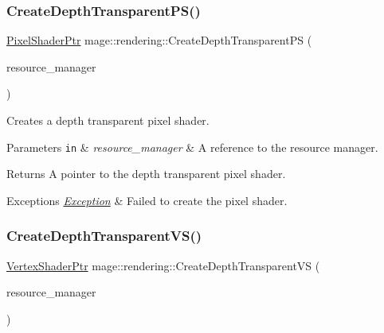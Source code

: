 \subsubsection{\texorpdfstring{Create\+Depth\+Transparent\+P\+S()}{CreateDepthTransparentPS()}}
{\footnotesize\ttfamily \mbox{\hyperlink{namespacemage_1_1rendering_af03d922b228ee9c8542baaa2ecc9f259}{Pixel\+Shader\+Ptr}} mage\+::rendering\+::\+Create\+Depth\+Transparent\+PS (\begin{DoxyParamCaption}\item[{\mbox{\hyperlink{classmage_1_1rendering_1_1_resource_manager}{Resource\+Manager}} \&}]{resource\+\_\+manager }\end{DoxyParamCaption})}

Creates a depth transparent pixel shader.


\begin{DoxyParams}[1]{Parameters}
\mbox{\tt in}  & {\em resource\+\_\+manager} & A reference to the resource manager. \\
\hline
\end{DoxyParams}
\begin{DoxyReturn}{Returns}
A pointer to the depth transparent pixel shader. 
\end{DoxyReturn}

\begin{DoxyExceptions}{Exceptions}
{\em \mbox{\hyperlink{classmage_1_1_exception}{Exception}}} & Failed to create the pixel shader. \\
\hline
\end{DoxyExceptions}
\mbox{\label{namespacemage_1_1rendering_afe609dd7d958d13de0d47f7619aeb74c}} 
\subsubsection{\texorpdfstring{Create\+Depth\+Transparent\+V\+S()}{CreateDepthTransparentVS()}}
{\footnotesize\ttfamily \mbox{\hyperlink{namespacemage_1_1rendering_aaf704b9c54a4181f4950a1761de69dda}{Vertex\+Shader\+Ptr}} mage\+::rendering\+::\+Create\+Depth\+Transparent\+VS (\begin{DoxyParamCaption}\item[{\mbox{\hyperlink{classmage_1_1rendering_1_1_resource_manager}{Resource\+Manager}} \&}]{resource\+\_\+manager }\end{DoxyParamCaption})}

